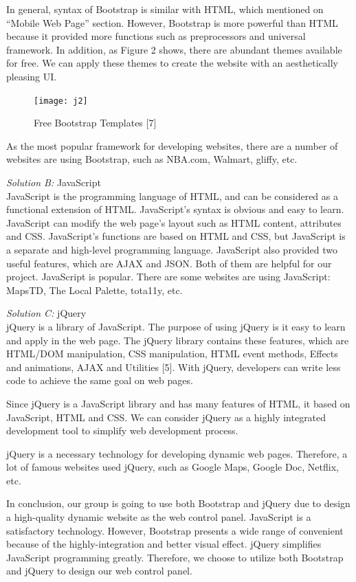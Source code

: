 \documentclass[letterpaper, 10pt,titlepage]{article}
\begin{document}
In general, syntax of Bootstrap is similar with HTML, which mentioned on “Mobile Web Page” section. However, Bootstrap is more powerful than HTML because it provided more functions such as preprocessors and universal framework. In addition, as Figure 2 shows, there are abundant themes available for free. We can apply these themes to create the website with an aesthetically pleasing UI. 


\begin{figure}[ht]
    \centering
    \texttt{[image: j2]}
    \caption{Free Bootstrap Templates [7]}
    \label{jiawei2}
\end{figure}

As the most popular framework for developing websites, there are a number of websites are using Bootstrap, such as NBA.com, Walmart, gliffy, etc. 


\textit{Solution B:} JavaScript\\
JavaScript is the programming language of HTML, and can be considered as a functional extension of HTML. JavaScript’s syntax is obvious and easy to learn. JavaScript can modify the web page’s layout such as HTML content, attributes and CSS. JavaScript’s functions are based on HTML and CSS, but JavaScript is a separate and high-level programming language. JavaScript also provided two useful features, which are AJAX and JSON. Both of them are helpful for our project. JavaScript is popular. There are some websites are using JavaScript: MapsTD, The Local Palette, tota11y, etc.


\textit{Solution C:} jQuery\\
jQuery is a library of JavaScript. The purpose of using jQuery is it easy to learn and apply in the web page. The jQuery library contains these features, which are HTML/DOM manipulation, CSS manipulation, HTML event methods, Effects and animations, AJAX and Utilities [5]. With jQuery, developers can write less code to achieve the same goal on web pages. 


Since jQuery is a JavaScript library and has many features of HTML, it based on JavaScript, HTML and CSS. We can consider jQuery as a highly integrated development tool to simplify web development process.


jQuery is a necessary technology for developing dynamic web pages. Therefore, a lot of famous websites used jQuery, such as Google Maps, Google Doc, Netflix, etc. 


In conclusion, our group is going to use both Bootstrap and jQuery due to design a high-quality dynamic website as the web control panel. JavaScript is a satisfactory technology. However, Bootstrap presents a wide range of convenient because of the highly-integration and better visual effect. jQuery simplifies JavaScript programming greatly. Therefore, we choose to utilize both Bootstrap and jQuery to design our web control panel.
\end{document}
